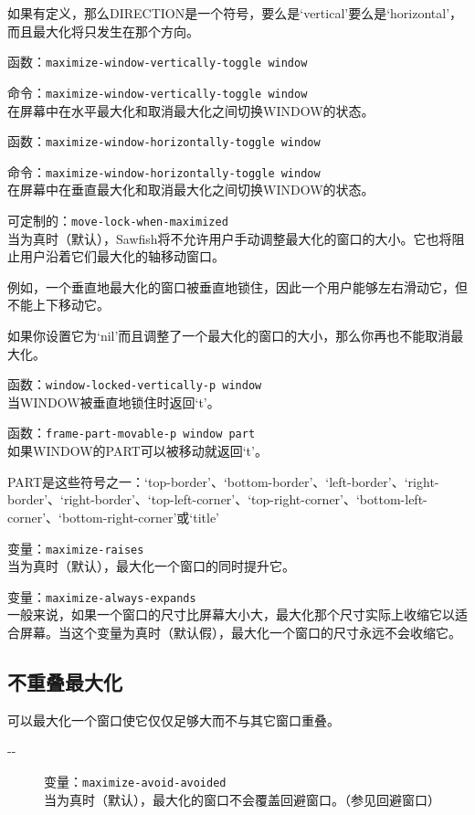 \documentclass{book}
\begin{document}
\begin{CJK*}{UTF8}{gbsn}
\begin{description}
如果有定义，那么DIRECTION是一个符号，要么是`vertical'要么是`horizontal'，而且最大化将只发生在那个方向。
\item[-{}-] 函数：\verb|maximize-window-vertically-toggle window|
\item[-{}-] 命令：\verb|maximize-window-vertically-toggle window|\\
在屏幕中在水平最大化和取消最大化之间切换WINDOW的状态。
\item[-{}-] 函数：\verb|maximize-window-horizontally-toggle window|
\item[-{}-] 命令：\verb|maximize-window-horizontally-toggle window|\\
在屏幕中在垂直最大化和取消最大化之间切换WINDOW的状态。
\item[-{}-] 可定制的：\verb|move-lock-when-maximized|\\
当为真时（默认），Sawfish将不允许用户手动调整最大化的窗口的大小。它也将阻止用户沿着它们最大化的轴移动窗口。

例如，一个垂直地最大化的窗口被垂直地锁住，因此一个用户能够左右滑动它，但不能上下移动它。

如果你设置它为`nil'而且调整了一个最大化的窗口的大小，那么你再也不能取消最大化。
\item[-{}-] 函数：\verb|window-locked-vertically-p window|\\
当WINDOW被垂直地锁住时返回`t'。
\item[-{}-] 函数：\verb|frame-part-movable-p window part|\\
如果WINDOW的PART可以被移动就返回`t'。

PART是这些符号之一：`top-border'、`bottom-border'、`left-border'、`right-border'、`right-border'、`top-left-corner'、`top-right-corner'、`bottom-left-corner'、`bottom-right-corner'或`title'
\item[-{}-] 变量：\verb|maximize-raises|\\
当为真时（默认），最大化一个窗口的同时提升它。
\item[-{}-] 变量：\verb|maximize-always-expands|\\
一般来说，如果一个窗口的尺寸比屏幕大小大，最大化那个尺寸实际上收缩它以适合屏幕。当这个变量为真时（默认假），最大化一个窗口的尺寸永远不会收缩它。
\end{description}
\subsection{不重叠最大化}
可以最大化一个窗口使它仅仅足够大而不与其它窗口重叠。
\begin{description}
\item[-{}-] 变量：\verb|maximize-avoid-avoided|\\
当为真时（默认），最大化的窗口不会覆盖回避窗口。（参见回避窗口）
\end{description}


\end{CJK*}
\end{document}
